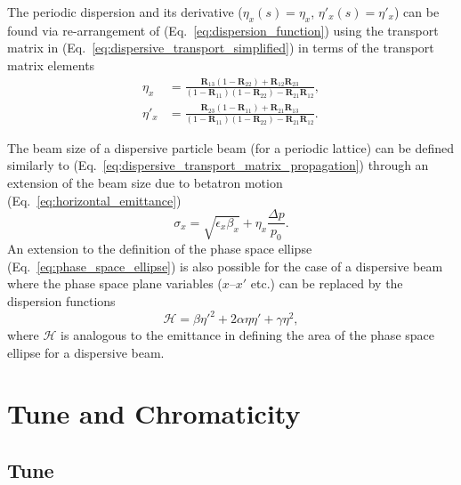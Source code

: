 \documentclass[../main.tex]{subfiles}
\begin{document}
The periodic dispersion and its derivative ($\eta_{x}\left(s\right)=\eta_{x}$, $\eta'_{x}\left(s\right)=\eta'_{x}$) can be found via re-arrangement of (Eq.~\ref{eq:dispersion_function}) using the transport matrix in (Eq.~\ref{eq:dispersive_transport_simplified}) in terms of the transport matrix elements
\begin{align}
\eta_{x} &= \frac{\boldsymbol{R}_{13}\left(1-\boldsymbol{R}_{22}\right)+\boldsymbol{R}_{12}\boldsymbol{R}_{23}}{\left(1-\boldsymbol{R}_{11}\right)\left(1-\boldsymbol{R}_{22}\right)-\boldsymbol{R}_{21}\boldsymbol{R}_{12}},
\label{eq:periodic_dispersion} \\
\eta'_{x} &= \frac{\boldsymbol{R}_{23}\left(1-\boldsymbol{R}_{11}\right)+\boldsymbol{R}_{21}\boldsymbol{R}_{13}}{\left(1-\boldsymbol{R}_{11}\right)\left(1-\boldsymbol{R}_{22}\right)-\boldsymbol{R}_{21}\boldsymbol{R}_{12}}.
\label{eq:periodic_dispersion_prime}
\end{align}

The beam size of a dispersive particle beam (for a periodic lattice) can be defined similarly to (Eq.~\ref{eq:dispersive_transport_matrix_propagation}) through an extension of the beam size due to betatron motion (Eq.~\ref{eq:horizontal_emittance})
\begin{equation}
\sigma_{x} = \sqrt{\epsilon_{x}\beta_{x}} + \eta_{x}\frac{\Delta p}{p_{0}}.
\label{eq:dispersive_beam_size}    
\end{equation}
An extension to the definition of the phase space ellipse (Eq.~\ref{eq:phase_space_ellipse}) is also possible for the case of a dispersive beam where the phase space plane variables ($x$--$x'$ etc.) can be replaced by the dispersion functions
\begin{equation}
\mathcal{H} = \beta\eta'^{2}+2\alpha\eta\eta'+\gamma\eta^{2},
\label{eq:dispersive_phase_space_ellipse}    
\end{equation}
where $\mathcal{H}$ is analogous to the emittance in defining the area of the phase space ellipse for a dispersive beam.

\section{Tune and Chromaticity}

\subsection{Tune}
\end{document}
